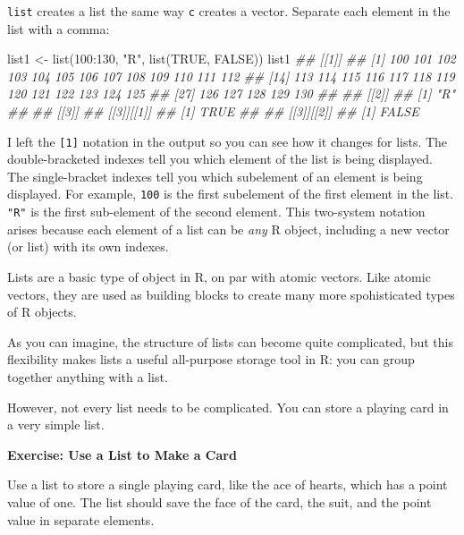 \documentclass[
  letterpaper,
  DIV=11,
  numbers=noendperiod]{scrbook}
\newenvironment{Shaded}{\begin{snugshade}}{\end{snugshade}}
\newcommand{\ConstantTok}[1]{\textcolor[rgb]{0.56,0.35,0.01}{#1}}
\newcommand{\DecValTok}[1]{\textcolor[rgb]{0.68,0.00,0.00}{#1}}
\newcommand{\DocumentationTok}[1]{\textcolor[rgb]{0.37,0.37,0.37}{\textit{#1}}}
\newcommand{\FunctionTok}[1]{\textcolor[rgb]{0.28,0.35,0.67}{#1}}
\newcommand{\NormalTok}[1]{\textcolor[rgb]{0.00,0.23,0.31}{#1}}
\newcommand{\OtherTok}[1]{\textcolor[rgb]{0.00,0.23,0.31}{#1}}
\newcommand{\SpecialCharTok}[1]{\textcolor[rgb]{0.37,0.37,0.37}{#1}}
\newcommand{\StringTok}[1]{\textcolor[rgb]{0.13,0.47,0.30}{#1}}
\begin{document}
\texttt{list} creates a list the same way \texttt{c} creates a vector.
Separate each element in the list with a comma:

\begin{Shaded}
\begin{Highlighting}[]
\NormalTok{list1 }\OtherTok{\textless{}{-}} \FunctionTok{list}\NormalTok{(}\DecValTok{100}\SpecialCharTok{:}\DecValTok{130}\NormalTok{, }\StringTok{"R"}\NormalTok{, }\FunctionTok{list}\NormalTok{(}\ConstantTok{TRUE}\NormalTok{, }\ConstantTok{FALSE}\NormalTok{))}
\NormalTok{list1}
\DocumentationTok{\#\# [[1]]}
\DocumentationTok{\#\# [1] 100 101 102 103 104 105 106 107 108 109 110 111 112}
\DocumentationTok{\#\# [14] 113 114 115 116 117 118 119 120 121 122 123 124 125}
\DocumentationTok{\#\# [27] 126 127 128 129 130}
\DocumentationTok{\#\# }
\DocumentationTok{\#\# [[2]]}
\DocumentationTok{\#\# [1] "R"}
\DocumentationTok{\#\#}
\DocumentationTok{\#\# [[3]]}
\DocumentationTok{\#\# [[3]][[1]]}
\DocumentationTok{\#\# [1] TRUE}
\DocumentationTok{\#\#}
\DocumentationTok{\#\# [[3]][[2]]}
\DocumentationTok{\#\# [1] FALSE}
\end{Highlighting}
\end{Shaded}

I left the \texttt{{[}1{]}} notation in the output so you can see how it
changes for lists. The double-bracketed indexes tell you which element
of the list is being displayed. The single-bracket indexes tell you
which subelement of an element is being displayed. For example,
\texttt{100} is the first subelement of the first element in the list.
\texttt{"R"} is the first sub-element of the second element. This
two-system notation arises because each element of a list can be
\emph{any} R object, including a new vector (or list) with its own
indexes.

Lists are a basic type of object in R, on par with atomic vectors. Like
atomic vectors, they are used as building blocks to create many more
spohisticated types of R objects.

As you can imagine, the structure of lists can become quite complicated,
but this flexibility makes lists a useful all-purpose storage tool in R:
you can group together anything with a list.

However, not every list needs to be complicated. You can store a playing
card in a very simple list.

\begin{tcolorbox}[enhanced jigsaw, left=2mm, breakable, colback=white, colframe=quarto-callout-color-frame, leftrule=.75mm, bottomrule=.15mm, arc=.35mm, opacityback=0, rightrule=.15mm, toprule=.15mm]

\vspace{-3mm}\textbf{Exercise: Use a List to Make a Card}\vspace{3mm}

Use a list to store a single playing card, like the ace of hearts, which
has a point value of one. The list should save the face of the card, the
suit, and the point value in separate elements.

\end{tcolorbox}
\end{document}
